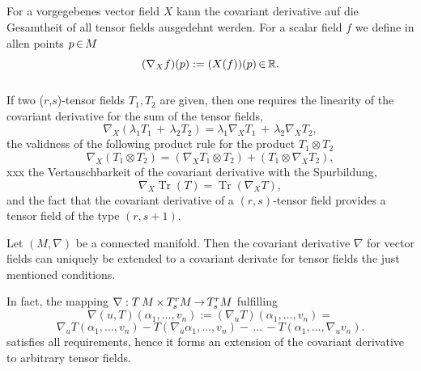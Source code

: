 \documentclass[11pt,twoside]{article}
\begin{document}
\subparagraph{}
For a vorgegebenes vector field $X$ kann the covariant derivative auf
die Gesamtheit of all tensor fields ausgedehnt werden.
For a scalar field $f$ we define in allen points $p {\,\in\,} {M}$
\[
(\nabla_X f)(p) := (X(f))(p) {\,\in\,} {\mathbb{R}}.
\]

\subparagraph{}
If two ($r$,$s$)-tensor fields $T_1, T_2$ are given,
then one requires the linearity of the covariant derivative
for the sum of the tensor fields,
\[
\nabla_X (\lambda_1 T_1 \, + \, \lambda_2 T_2) =
\lambda_1 \nabla_X T_1 \, + \, \lambda_2 \nabla_X T_2,
\]
the validness of the following product rule for the product $T_1 \otimes T_2$
\[
 \nabla_X (T_1 \otimes T_2) =
(\nabla_X T_1 \otimes T_2) + (T_1 \otimes \nabla_X T_2),
\]
xxx the Vertauschbarkeit of the covariant derivative with the Spurbildung,
\[
\nabla_X \operatorname{Tr}(T) = \operatorname{Tr}(\nabla_X T),
\]
and the fact
that the covariant derivative
of a $(r,s)$-tensor field provides a tensor field of the type $(r,s+1)$.

\begin{theorem}
Let $(M,\nabla)$ be a connected manifold.
Then the covariant derivative $\nabla$ for vector fields can uniquely be
extended to a covariant derivate for tensor fields
{\wrt} the just mentioned conditions.
\end{theorem}

In fact,
the mapping $\nabla: T\,{M} {\,\times\,} T^r_s {M} {\,\to\,} T^r_s {M}$ fulfilling
\[
\nabla(u,T)(\alpha_1,\ldots,v_n) := (\nabla_u T)(\alpha_1,\ldots,v_n) =
\]
\[
\nabla_u T(\alpha_1,\ldots, v_n) -
T(\nabla_u \alpha_1,\ldots,v_n) - \, \ldots \, -
T(\alpha_1,\ldots, \nabla_u v_n).
\]
satisfies all requirements,
hence it forms an extension of the covariant derivative
to arbitrary tensor fields.
\end{document}
